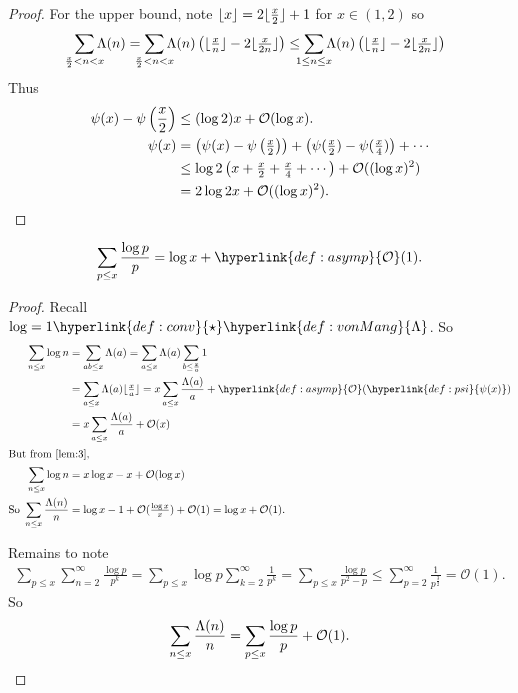 \documentclass{article}
\newcommand{\1}{\mathbbm{1}}
\newcommand{\bigO}{\mathcal{O}}
\DeclarePairedDelimiter\floor{\lfloor}{\rfloor}
\begin{document}
\begin{proof}
  For the upper bound, note $\floor{x} = 2 \floor{\frac{x}{2}} + 1$ for $x \in (1,2)$ so
  \begin{equation*}
    \sum_{\mathclap{\frac{x}{2} < n < x}} \Lambda(n) = \sum_{\mathclap{\frac{x}{2} < n < x}} \Lambda(n) \left(\floor{\tfrac{x}{n}} - 2 \floor{\tfrac{x}{2n}}\right) \leq \sum_{\mathclap{1 \leq n \leq x}} \Lambda(n) \left(\floor{\tfrac{x}{n}} - 2 \floor{\tfrac{x}{2n}}\right)
  \end{equation*}
  Thus
  \begin{align*}
    \psi(x) - \psi\left(\frac{x}{2}\right) &\leq (\log 2) x + \bigO(\log x). \\
    \psi(x) &= \left(\psi(x) - \psi\left(\tfrac{x}{2}\right)\right) + \left(\psi(\tfrac{x}{2}) - \psi(\tfrac{x}{4})\right) + \dotsb  \\
            &\leq \log 2\left(x + \tfrac{x}{2} + \tfrac{x}{4} + \dotsb\right) + \bigO((\log x)^2)\\
    &= 2 \log 2 x + \bigO((\log x)^2). \qedhere
  \end{align*}
\end{proof}
\begin{nlemma}\label{lem:7}
  \begin{equation*}
    \sum_{p \leq x} \frac{\log p}{p} = \log x + \hyperlink{def:asymp}{\bigO}(1).
  \end{equation*}
\end{nlemma}
\begin{proof}
  Recall $\log = 1 \hyperlink{def:conv}{\star} \hyperlink{def:vonMang}{\Lambda}$. So
  \begin{align*}
    \sum_{n \leq x} \log n &= \sum_{ab \leq x} \Lambda(a) = \sum_{a \leq x} \Lambda(a) \sum_{b \leq \frac{x}{a}} 1 \\
                           &= \sum_{a \leq x} \Lambda(a) \floor{\tfrac{x}{a}} = x \sum_{a \leq x} \frac{\Lambda(a)}{a} + \hyperlink{def:asymp}{\bigO}(\hyperlink{def:psi}{\psi(x)}) \\
                           &= x \sum_{a \leq x} \frac{\Lambda(a)}{a} + \bigO(x) \\
  \shortintertext{But from \cref{lem:3},}
    \sum_{n \leq x} \log n &= x \log x - x + \bigO(\log x) \\
    \text{So }\sum_{n \leq x} \frac{\Lambda(n)}{n} &= \log x - 1 + \mathcal{O}(\tfrac{\log x}{x}) + \bigO(1) = \log x + \bigO(1).
  \end{align*}

  Remains to note
  \begin{align*}
    \sum_{p \leq x} \sum_{n=2}^\infty \frac{\log p}{p^k} = \sum_{p \leq x} \log p \sum_{k=2}^\infty \frac{1}{p^k} = \sum_{p \leq x} \frac{\log p}{p^2 - p} \leq \sum_{p=2}^\infty \frac{1}{p^{\frac{3}{2}}} = \bigO(1).
  \end{align*}
  So
  \begin{equation*}\sum_{n \leq x} \frac{\Lambda(n)}n = \sum_{p \leq x} \frac{\log p}{p} + \bigO(1).\qedhere\end{equation*}
\end{proof}
\end{document}
